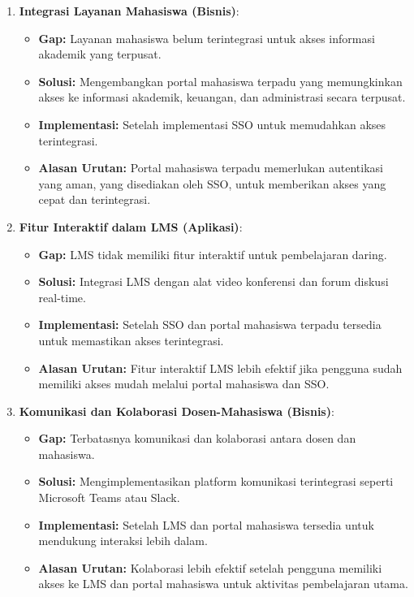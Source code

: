 \begin{enumerate}
	\item \textbf{Integrasi Layanan Mahasiswa (Bisnis)}:
	\begin{itemize}
		\item \textbf{Gap:} Layanan mahasiswa belum terintegrasi untuk akses informasi akademik yang terpusat.
		\item \textbf{Solusi:} Mengembangkan portal mahasiswa terpadu yang memungkinkan akses ke informasi akademik, keuangan, dan administrasi secara terpusat.
		\item \textbf{Implementasi:} Setelah implementasi SSO untuk memudahkan akses terintegrasi.
		\item \textbf{Alasan Urutan:} Portal mahasiswa terpadu memerlukan autentikasi yang aman, yang disediakan oleh SSO, untuk memberikan akses yang cepat dan terintegrasi.
	\end{itemize}
	
	\item \textbf{Fitur Interaktif dalam LMS (Aplikasi)}:
	\begin{itemize}
		\item \textbf{Gap:} LMS tidak memiliki fitur interaktif untuk pembelajaran daring.
		\item \textbf{Solusi:} Integrasi LMS dengan alat video konferensi dan forum diskusi real-time.
		\item \textbf{Implementasi:} Setelah SSO dan portal mahasiswa terpadu tersedia untuk memastikan akses terintegrasi.
		\item \textbf{Alasan Urutan:} Fitur interaktif LMS lebih efektif jika pengguna sudah memiliki akses mudah melalui portal mahasiswa dan SSO.
	\end{itemize}
	
	\item \textbf{Komunikasi dan Kolaborasi Dosen-Mahasiswa (Bisnis)}:
	\begin{itemize}
		\item \textbf{Gap:} Terbatasnya komunikasi dan kolaborasi antara dosen dan mahasiswa.
		\item \textbf{Solusi:} Mengimplementasikan platform komunikasi terintegrasi seperti Microsoft Teams atau Slack.
		\item \textbf{Implementasi:} Setelah LMS dan portal mahasiswa tersedia untuk mendukung interaksi lebih dalam.
		\item \textbf{Alasan Urutan:} Kolaborasi lebih efektif setelah pengguna memiliki akses ke LMS dan portal mahasiswa untuk aktivitas pembelajaran utama.
	\end{itemize}
	

\end{enumerate}
